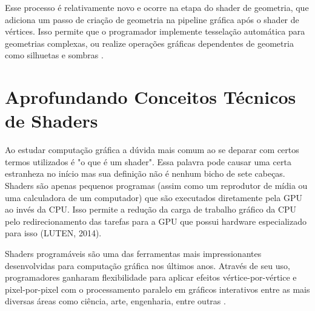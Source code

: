 Esse processo é relativamente novo e ocorre na etapa do shader de geometria, que adiciona um passo de criação de geometria na pipeline gráfica após o shader de vértices. Isso permite que o programador implemente tesselação automática para geometrias complexas, ou realize operações gráficas dependentes de geometria como silhuetas e sombras \cite{bailey2007}.

\section{Aprofundando Conceitos Técnicos de Shaders}
\label{sec:aprofundando-conceitos-tecnicos-shaders}


Ao estudar computação gráfica a dúvida mais comum ao se deparar com certos termos utilizados é "o que é um shader". Essa palavra pode causar uma certa estranheza no início mas sua definição não é nenhum bicho de sete cabeças. Shaders são apenas pequenos programas (assim como um reprodutor de mídia ou uma calculadora de um computador) que são executados diretamente pela \acrshort{GPU} ao invés da \acrshort{CPU}. Isso permite a redução da carga de trabalho gráfico da \acrshort{CPU} pelo redirecionamento das tarefas para a \acrshort{GPU} que possui hardware especializado para isso (LUTEN, 2014)\nocite{openGLBook}.

Shaders programáveis são uma das ferramentas mais impressionantes desenvolvidas para computação gráfica nos últimos anos. Através de seu uso, programadores ganharam flexibilidade para aplicar efeitos vértice-por-vértice e pixel-por-pixel com o processamento paralelo em gráficos interativos entre as mais diversas áreas como ciência, arte, engenharia, entre outras \cite{bailey2007}.

	\begin{figure}[h!]
		\centering
	\end{figure}
	\nocite{figura5}

